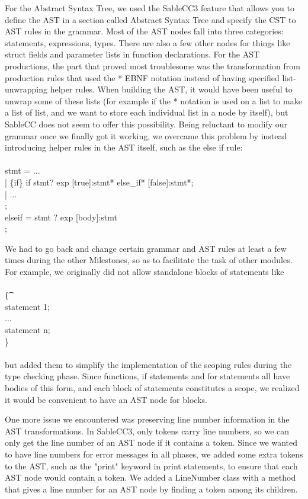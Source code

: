 \documentclass[11pt]{article}
\begin{document}
For the Abstract Syntax Tree, we used the SableCC3 feature that allows you to define the AST in a section called Abstract Syntax Tree and specify the CST to AST rules in the grammar. Most of the AST nodes fall into three categories: statements, expressions, types. There are also a few other nodes for things like struct fields and parameter lists in function declarations. For the AST productions, the part that proved most troublesome was the transformation from production rules that used the * EBNF notation instead of having specified list-unwrapping helper rules. When building the AST, it would have been useful to unwrap some of these lists (for example if the * notation is used on a list to make a list of list, and we want to store each individual list in a node by itself), but SableCC does not seem to offer this possibility. Being reluctant to modify our grammar once we finally got it working, we overcame this problem by instead introducing helper rules in the AST itself, such as the else if rule: \\ \ \\
\t{
stmt = ...\\
| \{if\} if stmt? exp [true]:stmt* else\_if* [false]:stmt*;\\
| ...\\
;\\
elseif = stmt ? exp [body]:stmt\*\\
;
}

We had to go back and change certain grammar and AST rules at least a few times during the other Milestones, so as to facilitate the task of other modules. For example, we originally did not allow standalone blocks of statements like \\ \ \\
\t{\{\\
	\indent statement 1;\\
	\indent...\\
	\indent statement n;\\
\}
}\\ \ \\
but added them to simplify the implementation of the scoping rules during the type checking phase. Since functions, if statements and for statements all have bodies of this form, and each block of statements constitutes a scope, we realized it would be convenient to have an AST node for blocks.


One more issue we encountered was preserving line number information in the AST transformations. In SableCC3, only tokens carry line numbers, so we can only get the line number of an AST node if it contains a token. Since we wanted to have line numbers for error messages in all phases, we added some extra tokens to the AST, such as the "print" keyword in print statements, to ensure that each AST node would contain a token. We added a LineNumber class with a method that gives a line number for an AST node by finding a token among its children.
\end{document}
